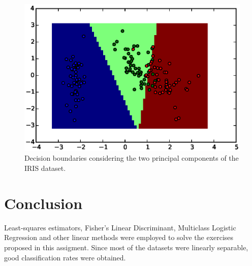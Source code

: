 \documentclass[a4paper,10pt]{article}
\begin{document}
\begin{figure}[htb]
 \centering
 \includegraphics[scale=0.7]{./figures/6f1.eps}
 \caption{Decision boundaries considering the two principal components of the IRIS dataset.}
 \label{fig:6f1}
\end{figure}

\cleardoublepage
\section{Conclusion}
Least-squares estimators, Fisher's Linear Discriminant, Multiclass Logistic Regression and other linear methods were employed to solve the exercises proposed in this assigment. Since most of the datasets were linearly separable, good classification rates were obtained.
\end{document}
